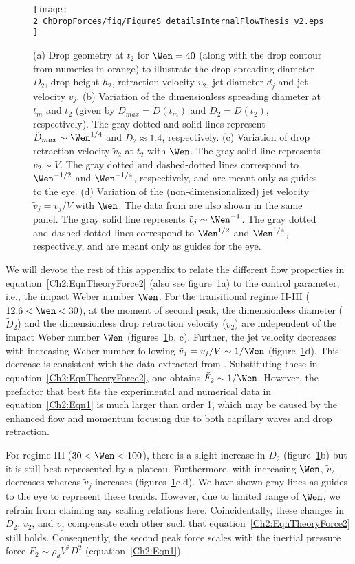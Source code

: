 \begin{subappendices}
	\begin{figure}
		\texttt{[image: 2\_ChDropForces/fig/FigureS\_detailsInternalFlowThesis\_v2.eps]}
		\caption{(a) Drop geometry at $t_2$ for $\Wen = 40$ (along with the drop contour from numerics in orange) to illustrate the drop spreading diameter $D_2$, drop height $h_2$, retraction velocity $v_2$, jet diameter $d_j$ and jet velocity $v_j$. (b) Variation of the dimensionless spreading diameter at $t_m$ and $t_2$ (given by $\tilde D_{max} = \tilde D (t_m)  $ and $\tilde D_2 = \tilde D(t_2) $, respectively). The gray dotted and solid lines represent $\tilde D_{max} \sim \Wen^{1/4}$ and $\tilde D_2 \approx 1.4$, respectively. (c) Variation of drop retraction velocity $\tilde{v}_2$ at $t_2$ with $\Wen$. The gray solid line represents $v_2 \sim V$. The gray dotted and dashed-dotted lines correspond to $\Wen^{-1/2}$ and $\Wen^{-1/4}$, respectively,  and are meant only as guides to the eye. (d) Variation of the (non-dimensionalized) jet velocity $\tilde{v}_j = v_j/V$ with $\Wen$. The data from \citet{bartolo2006singular} are also shown in the same panel. The gray solid line represents $\tilde{v}_j \sim \Wen^{-1}$. The gray dotted and dashed-dotted lines correspond to $\Wen^{1/2}$ and $\Wen^{1/4}$, respectively, and are meant only as guides for the eye.}
		\label{Ch2:Fig_details}
	\end{figure}

	We will devote the rest of this appendix to relate the different flow properties in equation~\eqref{Ch2:EqnTheoryForce2} (also see figure~\ref{Ch2:Fig_details}a) to the control parameter, i.e., the impact Weber number $\Wen$. For the transitional regime II-III ($12.6 < \Wen < 30$), at the moment of second peak, the dimensionless diameter ($\tilde{D}_2$) and the dimensionless drop retraction velocity ($\tilde{v}_2$) are independent of the impact Weber number $\Wen$ (figures~\ref{Ch2:Fig_details}b, c). Further, the jet velocity decreases with increasing Weber number following $\tilde{v}_j = v_j/V \sim 1/\Wen$ (figure~\ref{Ch2:Fig_details}d). This decrease is consistent with the data extracted from \citet{bartolo2006singular}. Substituting these in equation~\eqref{Ch2:EqnTheoryForce2}, one obtains $\tilde{F}_2 \sim 1/\Wen$. However, the prefactor that best fits the experimental and numerical data in equation~\eqref{Ch2:Eqn1} is much larger than order 1, which may be caused by the enhanced flow and momentum focusing due to both capillary waves and drop retraction.
	
	For regime III ($30 < \Wen < 100$), there is a slight increase in $\tilde{D}_2$ (figure~\ref{Ch2:Fig_details}b) but it is still best represented by a plateau. Furthermore, with increasing $\Wen$, $\tilde{v}_2$ decreases whereas $\tilde{v}_j$ increases (figures~\ref{Ch2:Fig_details}c,d). We have shown gray lines as guides to the eye to represent these trends. However, due to limited range of $\Wen$, we refrain from claiming any scaling relations here. Coincidentally, these changes in $\tilde{D}_2$, $\tilde{v}_2$, and $\tilde{v}_j$ compensate each other such that equation~\eqref{Ch2:EqnTheoryForce2} still holds. Consequently, the second peak force scales with the inertial pressure force $F_2 \sim \rho_d V^2D^2$ (equation~\eqref{Ch2:Eqn1}).
	

\end{subappendices}
